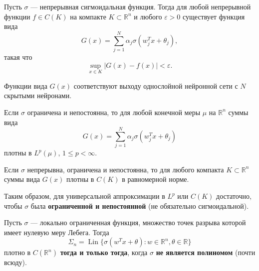 \documentclass[../NDCNNAI_main.tex]{subfiles}
\begin{document}
\begin{theorem}[Цыбенко]
    Пусть \( \sigma \) --- непрерывная сигмоидальная функция. Тогда для любой непрерывной функции \( f \in C(K) \) на компакте \( K \subset \mathbb{R}^n \) и любого \( \varepsilon > 0 \) существует функция вида
    \[
    G(x) = \sum_{j=1}^{N} \alpha_j \sigma(w_j^T x + \theta_j),
    \]
    такая что
    \[
    \sup_{x \in K} |G(x) - f(x)| < \varepsilon.
    \]
\end{theorem}

\begin{remark}
    Функции вида \( G(x) \) соответствуют выходу однослойной нейронной сети с \( N \) скрытыми нейронами.
\end{remark}
\begin{theorem}[Обобщение на \( L^p \)]
    Если \( \sigma \) ограничена и непостоянна, то для любой конечной меры \( \mu \) на \( \mathbb{R}^n \) суммы вида
    \[
    G(x) = \sum_{j=1}^{N} \alpha_j \sigma(w_j^T x + \theta_j)
    \]
    плотны в \( L^p(\mu) \), \( 1 \le p < \infty \).
\end{theorem}

\begin{theorem}[Обобщение на \( C(K) \)]
    Если \( \sigma \) непрерывна, ограничена и непостоянна, то для любого компакта \( K \subset \mathbb{R}^n \) суммы вида \( G(x) \) плотны в \( C(K) \) в равномерной норме.
\end{theorem}

\begin{remark}
    Таким образом, для универсальной аппроксимации в \( L^p \) или \( C(K) \) достаточно, чтобы \( \sigma \) была \textbf{ограниченной и непостоянной} (не обязательно сигмоидальной).
\end{remark}

\begin{theorem}
    Пусть \( \sigma \) --- локально ограниченная функция, множество точек разрыва которой имеет нулевую меру Лебега. Тогда
    \[
    \Sigma_n = \operatorname{Lin}\{\sigma(w^T x + \theta)\colon w \in \mathbb{R}^n, \theta \in \mathbb{R}\}
    \]
    плотно в \( C(\mathbb{R}^n) \) \textbf{тогда и только тогда}, когда \( \sigma \) \textbf{не является полиномом} (почти всюду).
\end{theorem}
\end{document}
